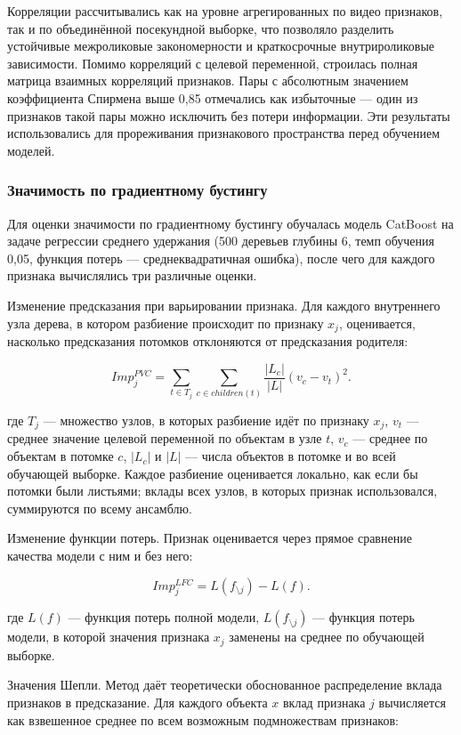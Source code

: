 \documentclass[times]{itmo-student-thesis}
\begin{document}
Корреляции рассчитывались как на уровне агрегированных по видео признаков, так и по объединённой посекундной выборке, что позволяло разделить устойчивые межроликовые закономерности и краткосрочные внутрироликовые зависимости. Помимо корреляций с целевой переменной, строилась полная матрица взаимных корреляций признаков. Пары с абсолютным значением коэффициента Спирмена выше 0,85 отмечались как избыточные — один из признаков такой пары можно исключить без потери информации. Эти результаты использовались для прореживания признакового пространства перед обучением моделей.

\subsubsection{Значимость по градиентному бустингу}

Для оценки значимости по градиентному бустингу обучалась модель CatBoost \cite{prokhorenkova2018catboost} на задаче регрессии среднего удержания (500 деревьев глубины 6, темп обучения 0,05, функция потерь — среднеквадратичная ошибка), после чего для каждого признака вычислялись три различные оценки.

Изменение предсказания при варьировании признака. Для каждого внутреннего узла дерева, в котором разбиение происходит по признаку $x_j$, оценивается, насколько предсказания потомков отклоняются от предсказания родителя:

\[
Imp_j^{PVC}=\sum_{t\in T_j}\sum_{c\in children(t)}\frac{|L_c|}{|L|}(v_c-v_t)^2.
\]

где $T_j$ — множество узлов, в которых разбиение идёт по признаку $x_j$, $v_t$ — среднее значение целевой переменной по объектам в узле $t$, $v_c$ — среднее по объектам в потомке $c$, $|L_c|$ и $|L|$ — числа объектов в потомке и во всей обучающей выборке. Каждое разбиение оценивается локально, как если бы потомки были листьями; вклады всех узлов, в которых признак использовался, суммируются по всему ансамблю.

Изменение функции потерь. Признак оценивается через прямое сравнение качества модели с ним и без него:

\[
Imp_j^{LFC}=L(f_{\setminus j})-L(f).
\]

где $L(f)$ — функция потерь полной модели, $L(f_{\setminus j})$ — функция потерь модели, в которой значения признака $x_j$ заменены на среднее по обучающей выборке.

Значения Шепли. Метод даёт теоретически обоснованное распределение вклада признаков в предсказание. Для каждого объекта $x$ вклад признака $j$ вычисляется как взвешенное среднее по всем возможным подмножествам признаков:
\end{document}
